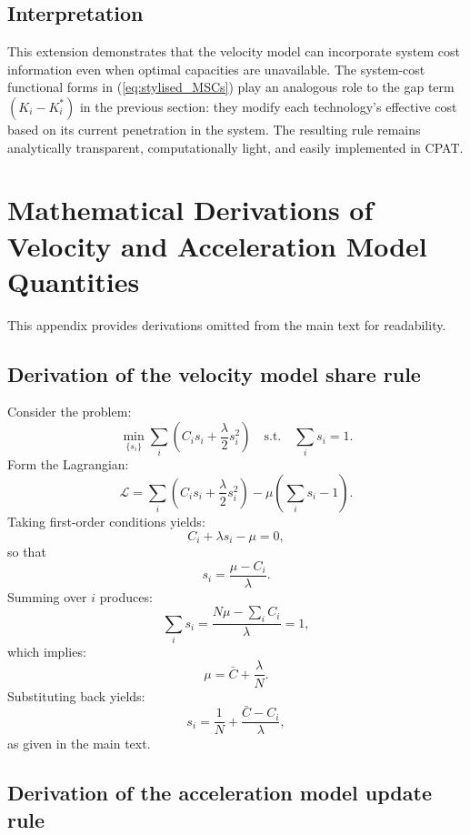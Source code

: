 \documentclass[preprint,authoryear,12pt]{elsarticle}
\begin{document}
\subsection*{Interpretation}

This extension demonstrates that the velocity model can incorporate system cost information
even when optimal capacities are unavailable. The system-cost functional forms in
(\ref{eq:stylised_MSCs}) play an analogous role to the gap term $(K_i - K_i^*)$ in the previous
section: they modify each technology’s effective cost based on its current penetration in the
system. The resulting rule remains analytically transparent, computationally light, and easily
implemented in CPAT.


\section{Mathematical Derivations of Velocity and Acceleration Model Quantities}

This appendix provides derivations omitted from the main text for readability.

\subsection{Derivation of the velocity model share rule}

Consider the problem:
\[
    \min_{\{s_i\}} \sum_i \left( C_i s_i + \frac{\lambda}{2} s_i^2 \right)
    \quad \text{s.t.} \quad \sum_i s_i = 1.
\]
Form the Lagrangian:
\[
    \mathcal{L} = \sum_i \left( C_i s_i + \frac{\lambda}{2} s_i^2 \right)
    - \mu \left( \sum_i s_i - 1 \right).
\]
Taking first-order conditions yields:
\[
    C_i + \lambda s_i - \mu = 0,
\]
so that
\[
    s_i = \frac{\mu - C_i}{\lambda}.
\]
Summing over $i$ produces:
\[
    \sum_i s_i = \frac{N\mu - \sum_i C_i}{\lambda} = 1,
\]
which implies:
\[
    \mu = \bar{C} + \frac{\lambda}{N}.
\]
Substituting back yields:
\[
    s_i = \frac{1}{N} + \frac{\bar{C} - C_i}{\lambda},
\]
as given in the main text.

\subsection{Derivation of the acceleration model update rule}
\end{document}
